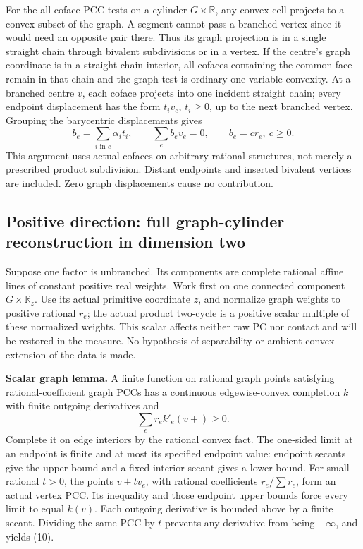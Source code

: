 \documentclass[
  11pt,
]{article}
\begin{document}
For the all-coface PCC tests on a cylinder \(G\times\mathbb{R}\), any
convex cell projects to a convex subset of the graph. A segment cannot
pass a branched vertex since it would need an opposite pair there. Thus
its graph projection is in a single straight chain through bivalent
subdivisions or in a vertex. If the centre's graph coordinate is in a
straight-chain interior, all cofaces containing the common face remain
in that chain and the graph test is ordinary one-variable convexity. At
a branched centre \(v\), each coface projects into one incident straight
chain; every endpoint displacement has the form \(t_i v_e\),
\(t_i\geq0\), up to the next branched vertex. Grouping the barycentric
displacements gives \[
 b_e=\sum_{i\text{ in }e}\alpha_i t_i,
 \qquad\sum_e b_ev_e=0,\qquad b_e=c r_e,\ c\geq0.           \tag{9}
\] This argument uses actual cofaces on arbitrary rational structures,
not merely a prescribed product subdivision. Distant endpoints and
inserted bivalent vertices are included. Zero graph displacements cause
no contribution.

\subsection{Positive direction: full graph-cylinder reconstruction in
dimension
two}\label{positive-direction-full-graph-cylinder-reconstruction-in-dimension-two}

Suppose one factor is unbranched. Its components are complete rational
affine lines of constant positive real weights. Work first on one
connected component \(G\times\mathbb{R}_z\). Use its actual primitive
coordinate \(z\), and normalize graph weights to positive rational
\(r_e\); the actual product two-cycle is a positive scalar multiple of
these normalized weights. This scalar affects neither raw PC nor contact
and will be restored in the measure. No hypothesis of separability or
ambient convex extension of the data is made.

\textbf{Scalar graph lemma.} A finite function on rational graph points
satisfying rational-coefficient graph PCCs has a continuous
edgewise-convex completion \(k\) with finite outgoing derivatives and \[
                              \sum_e r_e k'_e(v+)\geq0.        \tag{10}
\] Complete it on edge interiors by the rational convex fact. The
one-sided limit at an endpoint is finite and at most its specified
endpoint value: endpoint secants give the upper bound and a fixed
interior secant gives a lower bound. For small rational \(t>0\), the
points \(v+t v_e\), with rational coefficients \(r_e/\sum r_e\), form an
actual vertex PCC. Its inequality and those endpoint upper bounds force
every limit to equal \(k(v)\). Each outgoing derivative is bounded above
by a finite secant. Dividing the same PCC by \(t\) prevents any
derivative from being \(-\infty\), and yields (10).
\end{document}
